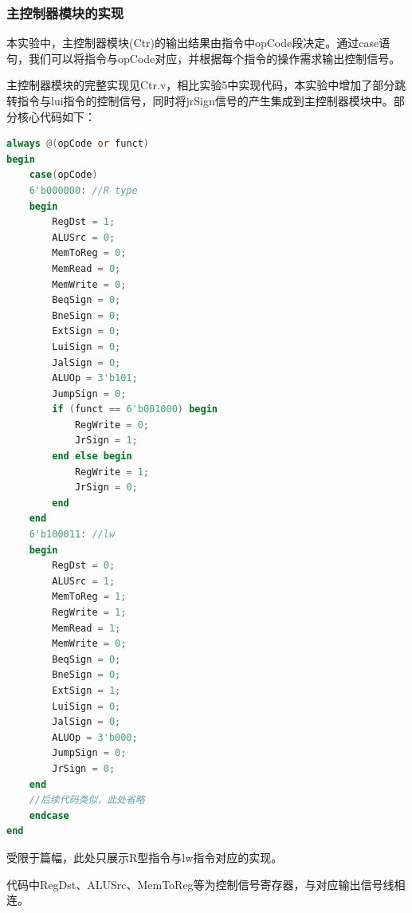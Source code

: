 \documentclass[UTF8]{ctexart}
\begin{document}
\subsubsection{主控制器模块的实现}
本实验中，主控制器模块(Ctr)的输出结果由指令中opCode段决定。通过case语句，我们可以将指令与opCode对应，并根据每个指令的操作需求输出控制信号。\par
主控制器模块的完整实现见Ctr.v，相比实验5中实现代码，本实验中增加了部分跳转指令与lui指令的控制信号，同时将jrSign信号的产生集成到主控制器模块中。部分核心代码如下：
\begin{lstlisting}[language=verilog]
always @(opCode or funct)
begin
    case(opCode)
    6'b000000: //R type
    begin
        RegDst = 1;
        ALUSrc = 0;
        MemToReg = 0;
        MemRead = 0;
        MemWrite = 0;
        BeqSign = 0;
        BneSign = 0;
        ExtSign = 0;
        LuiSign = 0;
        JalSign = 0;
        ALUOp = 3'b101;
        JumpSign = 0;
        if (funct == 6'b001000) begin
            RegWrite = 0;
            JrSign = 1;
        end else begin
            RegWrite = 1;
            JrSign = 0;
        end
    end
    6'b100011: //lw
    begin
        RegDst = 0;
        ALUSrc = 1;
        MemToReg = 1;
        RegWrite = 1;
        MemRead = 1;
        MemWrite = 0;
        BeqSign = 0;
        BneSign = 0;
        ExtSign = 1;
        LuiSign = 0;
        JalSign = 0;
        ALUOp = 3'b000;
        JumpSign = 0;
        JrSign = 0;
    end
    //后续代码类似，此处省略
    endcase
end
\end{lstlisting}
受限于篇幅，此处只展示R型指令与lw指令对应的实现。\par
代码中RegDst、ALUSrc、MemToReg等为控制信号寄存器，与对应输出信号线相连。
\end{document}
